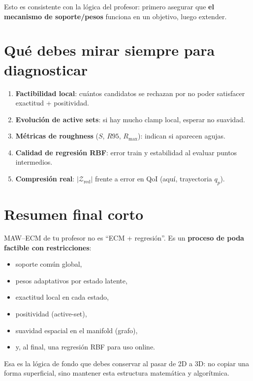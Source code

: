 \documentclass[11pt,a4paper]{article}
\begin{document}
Esto es consistente con la l\'ogica del profesor: primero asegurar que
\textbf{el mecanismo de soporte/pesos} funciona en un objetivo, luego extender.

\section{Qu\'e debes mirar siempre para diagnosticar}
\begin{enumerate}[leftmargin=1.2cm]
    \item \textbf{Factibilidad local}: cu\'antos candidatos se rechazan por no
    poder satisfacer exactitud + positividad.
    \item \textbf{Evoluci\'on de active sets}: si hay mucho clamp local, esperar
    no suavidad.
    \item \textbf{M\'etricas de roughness} ($S$, $R95$, $R_{\max}$): indican si
    aparecen agujas.
    \item \textbf{Calidad de regresi\'on RBF}: error train y estabilidad al
    evaluar puntos intermedios.
    \item \textbf{Compresi\'on real}: $|\mathcal Z_{\text{red}}|$ frente a
    error en QoI (aqu\'i, trayectoria $q_p$).
\end{enumerate}

\section{Resumen final corto}
MAW--ECM de tu profesor no es ``ECM + regresi\'on''.
Es un \textbf{proceso de poda factible con restricciones}:
\begin{itemize}[leftmargin=0.8cm]
    \item soporte com\'un global,
    \item pesos adaptativos por estado latente,
    \item exactitud local en cada estado,
    \item positividad (active-set),
    \item suavidad espacial en el manifold (grafo),
    \item y, al final, una regresi\'on RBF para uso online.
\end{itemize}

Esa es la l\'ogica de fondo que debes conservar al pasar de 2D a 3D: no copiar
una forma superficial, sino mantener esta estructura matem\'atica y algor\'itmica.
\end{document}
